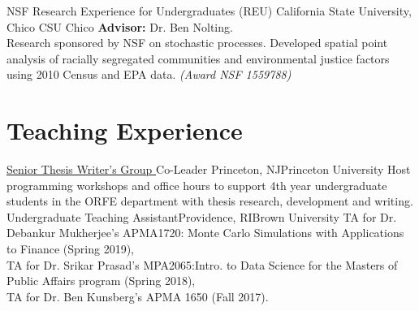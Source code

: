 \documentclass[10pt,a4paper,roman]{moderncv}        %
\begin{document}
{NSF Research Experience for Undergraduates (REU)}
{California State University, Chico}
{CSU Chico}
{\textbf{Advisor:} Dr. Ben Nolting.
  \\
 Research sponsored by NSF on stochastic processes.
  Developed spatial point analysis of racially segregated communities
  and environmental justice factors using 2010 Census and EPA data.
\textit{(Award NSF 1559788)}}

\section{Teaching Experience}
{\color{blue}\href{https://orfe.princeton.edu/undergraduate/stwg}{Senior Thesis
    Writer's Group }\color{black} Co-Leader}
{Princeton, NJ}{Princeton University}
{Host programming workshops and office hours to support
  4th year undergraduate students in the ORFE department with thesis research, development and writing.}
{Undergraduate Teaching Assistant}{Providence, RI}{Brown University}
{TA for Dr. Debankur Mukherjee's APMA1720: Monte Carlo Simulations with Applications to Finance (Spring 2019), \\
TA for Dr. Srikar Prasad's MPA2065:Intro. to Data Science for the Masters of Public Affairs program (Spring 2018),
\\
TA for Dr. Ben Kunsberg's APMA 1650 (Fall 2017).
}
\end{document}
